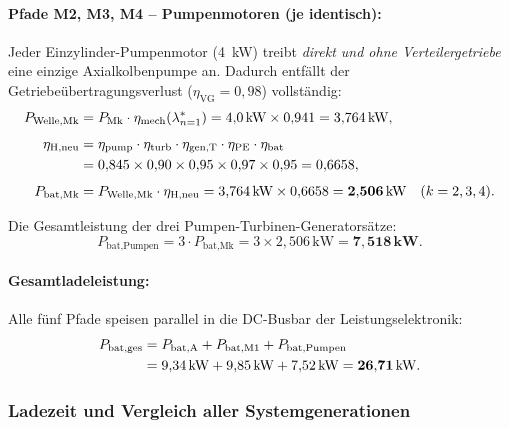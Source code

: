 ﻿\documentclass[a4paper,12pt]{article}
\begin{document}
\paragraph{Pfade M2, M3, M4 -- Pumpenmotoren (je identisch):}
Jeder Einzylinder-Pumpenmotor (4~kW) treibt \textit{direkt und
ohne Verteilergetriebe} eine einzige Axialkolbenpumpe an. Dadurch
entfällt der Getriebeübertragungsverlust ($\eta_\text{VG} = 0{,}98$)
vollständig:
\begin{align}
  P_\text{Welle,Mk}
    &= P_\text{Mk} \cdot \eta_\text{mech}(\lambda^*_{n=1})
     = 4{,}0\,\text{kW} \times 0{,}941
     = 3{,}764\,\text{kW},
  \label{eq:P_welle_Mk_4mot} \\[4pt]
  \eta_\text{H,neu}
    &= \eta_\text{pump} \cdot \eta_\text{turb} \cdot \eta_\text{gen,T}
       \cdot \eta_\text{PE} \cdot \eta_\text{bat} \notag \\
    &= 0{,}845 \times 0{,}90 \times 0{,}95 \times 0{,}97 \times 0{,}95
     = 0{,}6658,
  \label{eq:eta_H_neu_4mot} \\[4pt]
  P_\text{bat,Mk}
    &= P_\text{Welle,Mk} \cdot \eta_\text{H,neu}
     = 3{,}764\,\text{kW} \times 0{,}6658
     = \mathbf{2{,}506\,\text{kW}} \quad (k = 2, 3, 4).
  \label{eq:P_bat_Mk_4mot}
\end{align}

Die Gesamtleistung der drei Pumpen-Turbinen-Generatorsätze:
\begin{equation}
  P_\text{bat,Pumpen}
    = 3 \cdot P_\text{bat,Mk}
    = 3 \times 2{,}506\,\text{kW}
    = \mathbf{7{,}518\,\text{kW}}.
  \label{eq:P_bat_pumpen_4mot}
\end{equation}

\paragraph{Gesamtladeleistung:}
Alle fünf Pfade speisen parallel in die DC-Busbar der Leistungselektronik:
\begin{align}
  P_\text{bat,ges}
    &= P_\text{bat,A}
     + P_\text{bat,M1}
     + P_\text{bat,Pumpen} \notag \\
    &= 9{,}34\,\text{kW}
     + 9{,}85\,\text{kW}
     + 7{,}52\,\text{kW}
     = \mathbf{26{,}71\,\text{kW}}.
  \label{eq:P_bat_ges_4mot}
\end{align}

\subsubsection{Ladezeit und Vergleich aller Systemgenerationen}
\end{document}
